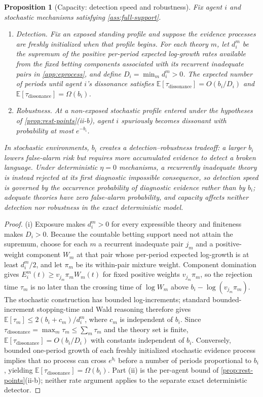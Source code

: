 \documentclass[11pt]{article}
\newtheorem{proposition}[assumption]{Proposition}
\theoremstyle{definition}
\begin{document}
\begin{proposition}[Capacity: detection speed and robustness]
\label{prop:capacity}
Fix agent $i$ and stochastic mechanisms satisfying \cref{ass:full-support}.
\begin{enumerate}[label=(\roman*)]
  \item \emph{Detection.} Fix an exposed standing profile and suppose the evidence processes are freshly initialized when that profile begins.
  For each theory $m$, let $d_i^m$ be the supremum of the positive per-period expected log-growth rates available from the fixed betting components associated with its recurrent inadequate pairs in \cref{app:eprocess}, and define $D_i=\min_m d_i^m>0$.
  The expected number of periods until agent $i$'s dissonance satisfies $\mathbb E[\tau_{\mathrm{dissonance}}]=O(b_i/D_i)$ and $\mathbb E[\tau_{\mathrm{dissonance}}]=\Omega(b_i)$.
  \item \emph{Robustness.} At a non-exposed stochastic profile entered under the hypotheses of \cref{prop:rest-points}(ii-b), agent $i$ spuriously becomes dissonant with probability at most $e^{-b_i}$.
\end{enumerate}
In stochastic environments, $b_i$ creates a detection--robustness tradeoff: a larger $b_i$ lowers false-alarm risk but requires more accumulated evidence to detect a broken language.
Under deterministic $\eta=0$ mechanisms, a recurrently inadequate theory is instead rejected at its first diagnostic impossible consequence, so detection speed is governed by the occurrence probability of diagnostic evidence rather than by $b_i$; adequate theories have zero false-alarm probability, and capacity affects neither detection nor robustness in the exact deterministic model.
\end{proposition}

\begin{proof}
(i) Exposure makes $d_i^m>0$ for every expressible theory and finiteness makes $D_i>0$.
Because the countable betting support need not attain the supremum, choose for each $m$ a recurrent inadequate pair $j_m$ and a positive-weight component $W_m$ at that pair whose per-period expected log-growth is at least $d_i^m/2$, and let $\pi_m$ be its within-pair mixture weight.
Component domination gives $E_i^m(t)\ge v_{j_m}\pi_m W_m(t)$ for fixed positive weights $v_{j_m}\pi_m$, so the rejection time $\tau_m$ is no later than the crossing time of $\log W_m$ above $b_i-\log(v_{j_m}\pi_m)$.
The stochastic construction has bounded log-increments; standard bounded-increment stopping-time and Wald reasoning therefore gives $\mathbb E[\tau_m]\le 2(b_i+c_m)/d_i^m$, where $c_m$ is independent of $b_i$.
Since $\tau_{\mathrm{dissonance}}=\max_m\tau_m\le\sum_m\tau_m$ and the theory set is finite, $\mathbb E[\tau_{\mathrm{dissonance}}]=O(b_i/D_i)$ with constants independent of $b_i$.
Conversely, bounded one-period growth of each freshly initialized stochastic evidence process implies that no process can cross $e^{b_i}$ before a number of periods proportional to $b_i$, yielding $\mathbb E[\tau_{\mathrm{dissonance}}]=\Omega(b_i)$.
Part (ii) is the per-agent bound of \cref{prop:rest-points}(ii-b); neither rate argument applies to the separate exact deterministic detector.
\end{proof}
\end{document}
